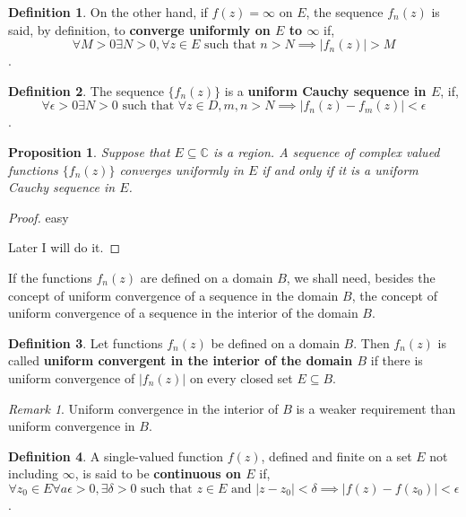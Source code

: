 \documentclass[
]{book}
\newtheorem{proposition}{Proposition}[chapter]
\theoremstyle{definition}
\newtheorem{definition}{Definition}[chapter]
\theoremstyle{definition}
\theoremstyle{definition}
\theoremstyle{definition}
\theoremstyle{remark}
\newtheorem*{remark}{Remark}
\begin{document}
\begin{definition}
\protect\hypertarget{def:unnamed-chunk-4}{}\label{def:unnamed-chunk-4}On the other hand, if \(f(z) = \infty\) on \(E\), the sequence \(f_n (z)\) is said, by definition, to \textbf{converge uniformly on \(E\) to \(\infty\)} if,
\[\forall M > 0 \exists N > 0,  \forall z \in E \text{ such that } n > N \implies |f_n (z)| > M\].
\end{definition}

\begin{definition}
\protect\hypertarget{def:unnamed-chunk-5}{}\label{def:unnamed-chunk-5}The sequence \(\{f_n(z)\}\) is a \textbf{uniform Cauchy sequence in \(E\)}, if,
\[\forall \epsilon > 0 \exists N > 0 \text{ such that } \forall z \in D, m, n > N \implies |f_n(z) - f_m(z)| < \epsilon\].
\end{definition}

\begin{proposition}
\protect\hypertarget{prp:unnamed-chunk-6}{}\label{prp:unnamed-chunk-6}Suppose that \(E \subseteq \mathbb{C}\) is a region. A sequence of complex valued functions \(\{f_n(z)\}\) converges uniformly in \(E\) if and only if it is a uniform Cauchy sequence in \(E\).
\end{proposition}

\begin{proof}
easy

Later I will do it.
\end{proof}

If the functions \(f_n (z)\) are defined on a domain \(B\), we shall need, besides the concept of uniform convergence of a sequence in the domain \(B\), the concept of uniform convergence of a sequence in the interior of the domain \(B\).

\begin{definition}
\protect\hypertarget{def:unnamed-chunk-8}{}\label{def:unnamed-chunk-8}Let functions \(f_n (z)\) be defined on a domain \(B\). Then \(f_n(z)\) is called \textbf{uniform convergent in the interior of the domain \(B\)} if there is uniform convergence of \(|f_n (z)|\) on every closed set \(E \subseteq B\).
\end{definition}

\begin{remark}
Uniform convergence in the interior of \(B\) is a weaker requirement than uniform convergence in \(B\).
\end{remark}

\begin{definition}
\protect\hypertarget{def:unnamed-chunk-10}{}\label{def:unnamed-chunk-10}A single-valued function \(f(z)\), defined and finite on a set \(E\) not including \(\infty\), is said to be \textbf{continuous on \(E\)} if,
\[\forall z_0 \in E \forall a\epsilon > 0, \exists \delta > 0 \text { such that } z \in E \text{ and } |z - z_0| < \delta \implies |f(z) - f(z_0)| < \epsilon\].
\end{definition}
\end{document}

